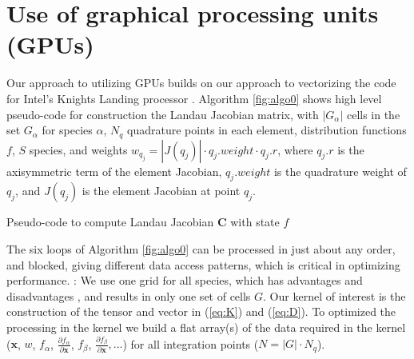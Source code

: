 \documentclass[12pt]{siamart}
\begin{document}
\section{Use of graphical processing units (GPUs)}

Our approach to utilizing GPUs builds on our approach to vectorizing the code for Intel's Knights Landing processor \cite{AdamsHirvijokiKnepleyBrownIsaacMills2017}.
Algorithm \ref{fig:algo0} shows high level pseudo-code for construction the
Landau Jacobian matrix, with $|G_\alpha|$ cells in the set $G_\alpha$ for species $\alpha$, $N_q$
quadrature points in each element, distribution functions $f$, $S$
species, and weights $w_{q_j} = |J\left(q_j\right)| \cdot q_j.weight
\cdot q_j.r$, where $q_j.r$ is the axisymmetric term of the element
Jacobian, $q_j.weight$ is the quadrature weight of $q_j$, and
$J\left(q_j\right)$ is the element Jacobian at point $q_j$.
\begin{algorithm}[h!]
\begin{algorithmic}[100]
\ENDFOR
\ENDFOR
\ENDFOR
\ENDFOR
\ENDFOR
\ENDFOR
\end{algorithmic} 
\caption{Pseudo-code to compute Landau Jacobian $\mathbf{C}$ with state $f$}
\label{fig:algo0}
\end{algorithm}
The six loops of Algorithm \ref{fig:algo0} can be processed in just about any
order, and blocked, giving different data access patterns, which is
critical in optimizing performance.
:
We use one grid for all species, which has advantages and disadvantages \cite{AdamsHirvijokiKnepleyBrownIsaacMills2017}, and results in only one set of cells $G$.
Our kernel of interest is the construction of the tensor and vector in (\ref{eq:K}) and (\ref{eq:D}).
To optimized the processing in the kernel we build a flat array(s) of the data required in the kernel ($\bm x$, $w$, $f_{\alpha}$,  $\frac{\partial f_{\alpha}}{\partial \bm x}$,  $f_{\beta}$,  $\frac{\partial f_{\beta}}{\partial \bm x}, ... $) for all integration points ($N = | G | \cdot N_q$).
\end{document}
